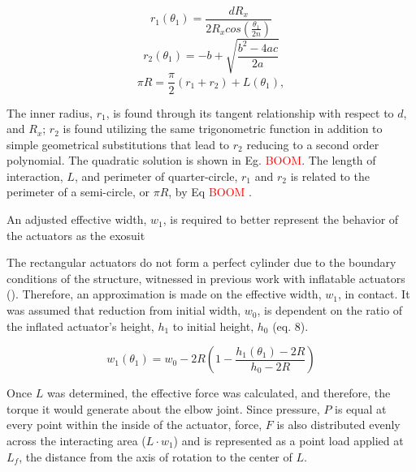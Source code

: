 \documentclass[letterpaper, 10 pt, conference]{ieeeconf}  %
\begin{document}
\begin{equation}\label{r1}
	r_1(\theta_1)  = \frac{dR_x}{2R_xcos(\frac{\theta_1}{2\textit{n}})}
\end{equation}\label{r2}
 \begin{equation}
	r_2(\theta_1)  = -b + \sqrt{\frac{b^2-4ac}{2a}}
\end{equation}
\begin{equation}\label{L}
	 \pi R = \frac{\pi}{2}(r_1+r_2) + L(\theta_1),
\end{equation}



The inner radius, $r_1$, is found through its tangent relationship with respect to $d$, and $R_x$; $r_2$ is found utilizing the same trigonometric function in addition to simple geometrical substitutions that lead to $r_2$ reducing to a second order polynomial. The quadratic solution is shown in Eg. \textcolor{red}{BOOM}. The length of interaction, $L$, and perimeter of quarter-circle, $r_1$ and $r_2$ is related to the perimeter of a semi-circle, or $\pi R$, by Eq \textcolor{red}{BOOM }. 




An adjusted effective width, $w_1$, is required to better represent the behavior of the actuators as the exosuit 


The rectangular actuators do not form a perfect cylinder due to the boundary conditions of the structure, witnessed in previous work with inflatable actuators (\cite{Natividad2017}). Therefore, an approximation is made on the effective width, $w_1$, in contact. It was assumed that reduction from initial width, $w_0$, is dependent on the ratio of the inflated actuator's height, $h_1$ to initial height, $h_0$ (eq. 8).

\begin{equation}\label{w1}
	w_1(\theta_1)  = w_0-2R(1-\frac{h_1(\theta_1)-2R}{h_0-2R})
\end{equation}

Once $\textit{L}$ was determined, the effective force was calculated, and therefore, the torque it would generate about the elbow joint. Since pressure, $\textit{P}$ is equal at every point within the inside of the actuator, force, $\textit{F}$ is also distributed evenly across the interacting area ($L\cdot w_{1}$) and is represented as a point load applied at $L_f$, the distance from the axis of rotation to the center of $L$.
\end{document}
